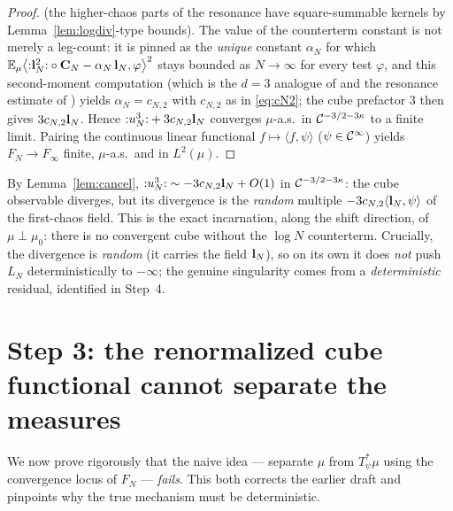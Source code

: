 \begin{proof}
(the higher-chaos parts of the resonance have square-summable kernels by
Lemma~\ref{lem:logdiv}-type bounds). The value of the counterterm constant is not merely
a leg-count: it is pinned as the \emph{unique} constant $\alpha_N$ for which
$\mathbb{E}_\mu\bigl\langle{:}\mathbf{l}_N^2{:}\circ\mathbf{C}_N-\alpha_N\,\mathbf{l}_N,\varphi\bigr\rangle^2$
stays bounded as $N\to\infty$ for every test $\varphi$, and this second-moment
computation (which is the $d=3$ analogue of \cite[Lems.~3.11--3.12]{HKN24} and the
resonance estimate of \cite{CC18}) yields $\alpha_N=c_{N,2}$ with $c_{N,2}$ as in
\eqref{eq:cN2}; the cube prefactor $3$ then gives $3c_{N,2}\mathbf{l}_N$. Hence
${:}u_N^3{:}+3c_{N,2}\mathbf{l}_N$ converges $\mu$-a.s.\ in $\mathcal{C}^{-3/2-3\kappa}$ to a
finite limit. Pairing the continuous linear functional $f\mapsto\langle f,\psi\rangle$
($\psi\in\mathcal{C}^\infty$) yields $F_N\to F_\infty$ finite, $\mu$-a.s.\ and in $L^2(\mu)$.
\end{proof}

\begin{remark}
By Lemma~\ref{lem:cancel}, ${:}u_N^3{:}\sim-3c_{N,2}\mathbf{l}_N+O(1)$ in
$\mathcal{C}^{-3/2-3\kappa}$: the cube observable diverges, but its divergence is the
\emph{random} multiple $-3c_{N,2}\langle\mathbf{l}_N,\psi\rangle$ of the first-chaos
field. This is the exact incarnation, along the shift direction, of $\mu\perp\mu_0$:
there is no convergent cube without the $\log N$ counterterm. Crucially, the divergence
is \emph{random} (it carries the field $\mathbf{l}_N$), so on its own it does \emph{not}
push $L_N$ deterministically to $-\infty$; the genuine singularity comes from a
\emph{deterministic} residual, identified in Step~4.
\end{remark}

\section*{Step 3: the renormalized cube functional cannot separate the measures}

We now prove rigorously that the naive idea --- separate $\mu$ from $T_\psi^*\mu$ using
the convergence locus of $F_N$ --- \emph{fails}. This both corrects the earlier draft
and pinpoints why the true mechanism must be deterministic.

